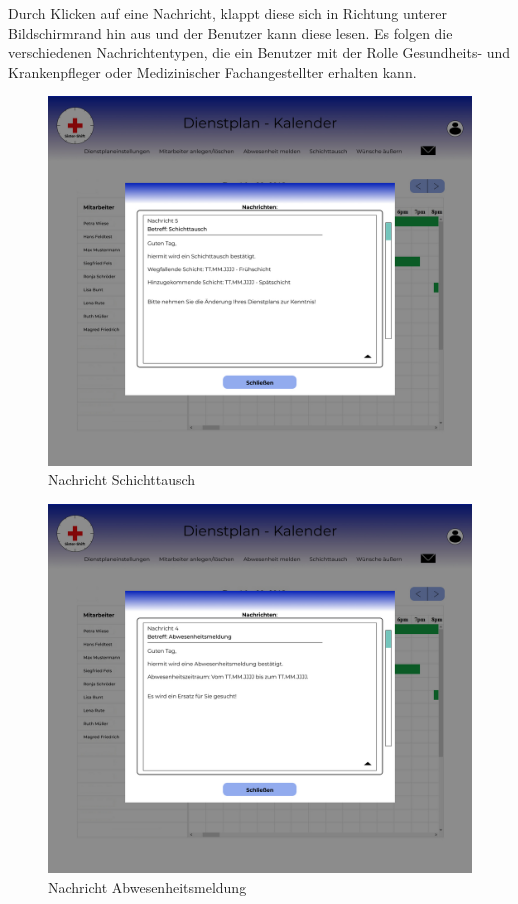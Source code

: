 \documentclass[11pt,
paper=a4,
bibtotocnumbered,	  %
liststotocnumbered,  %
DIV=calc,		  %
tablecaptionabove,	  %
headinclude,
]{article}
\begin{document}
Durch Klicken auf eine Nachricht, klappt diese sich in Richtung unterer Bildschirmrand hin aus und der Benutzer kann diese lesen. Es folgen die verschiedenen Nachrichtentypen, die ein Benutzer mit der Rolle Gesundheits- und Krankenpfleger oder Medizinischer Fachangestellter erhalten kann.
\begin{figure}[H]
\includegraphics[width=1\textwidth]{Bilder/Screens/NachrichtKrankenpflegerSchichttausch.jpg}{\centering}
\caption{Nachricht Schichttausch}
\end{figure}
\begin{figure}[H]
\includegraphics[width=1\textwidth]{Bilder/Screens/NachrichtKrankenpflegerAbwesenheitsmeldung.jpg}{\centering}
\caption{Nachricht Abwesenheitsmeldung}
\end{figure}
\end{document}

